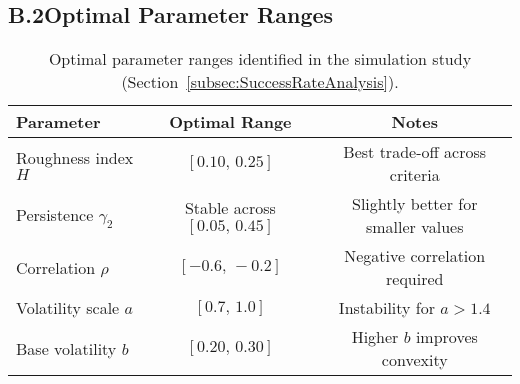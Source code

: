 \subsection*{B.2\quad Optimal Parameter Ranges}

\begin{table}[H]
    \centering
    \small
    \begin{tabular}{lcc}
        \toprule
        Parameter & Optimal Range & Notes \\
        \midrule
        Roughness index $H$ & $[0.10,\,0.25]$ & Best trade-off across criteria \\
        Persistence $\gamma_2$ & Stable across $[0.05,\,0.45]$ & Slightly better for smaller values \\
        Correlation $\rho$ & $[-0.6,\,-0.2]$ & Negative correlation required \\
        Volatility scale $a$ & $[0.7,\,1.0]$ & Instability for $a > 1.4$ \\
        Base volatility $b$ & $[0.20,\,0.30]$ & Higher $b$ improves convexity \\
        \bottomrule
    \end{tabular}
    \caption{Optimal parameter ranges identified in the simulation study (Section~\ref{subsec:SuccessRateAnalysis}).}
    \label{tab:OptimalRanges}
\end{table}